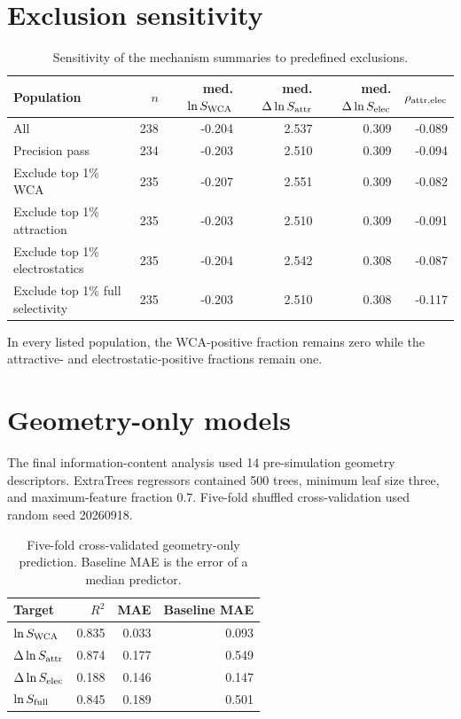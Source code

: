 \documentclass[11pt,a4paper]{article}
\begin{document}
\section{Exclusion sensitivity}

\begin{table}[H]
\centering
\caption{Sensitivity of the mechanism summaries to predefined exclusions.}
\begin{tabular}{lrrrrr}
\toprule
Population & $n$ & med. $\ln S_{\rm WCA}$ & med. $\Delta\ln S_{\rm attr}$ & med. $\Delta\ln S_{\rm elec}$ & $\rho_{\rm attr,elec}$\\
\midrule
All & 238 & -0.204 & 2.537 & 0.309 & -0.089\\
Precision pass & 234 & -0.203 & 2.510 & 0.309 & -0.094\\
Exclude top 1\% WCA & 235 & -0.207 & 2.551 & 0.309 & -0.082\\
Exclude top 1\% attraction & 235 & -0.203 & 2.510 & 0.309 & -0.091\\
Exclude top 1\% electrostatics & 235 & -0.204 & 2.542 & 0.308 & -0.087\\
Exclude top 1\% full selectivity & 235 & -0.203 & 2.510 & 0.308 & -0.117\\
\bottomrule
\end{tabular}
\end{table}

In every listed population, the WCA-positive fraction remains zero while the attractive- and electrostatic-positive fractions remain one.

\section{Geometry-only models}

The final information-content analysis used 14 pre-simulation geometry descriptors. ExtraTrees regressors contained 500 trees, minimum leaf size three, and maximum-feature fraction 0.7. Five-fold shuffled cross-validation used random seed 20260918.

\begin{table}[H]
\centering
\caption{Five-fold cross-validated geometry-only prediction. Baseline MAE is the error of a median predictor.}
\begin{tabular}{lrrr}
\toprule
Target & $R^2$ & MAE & Baseline MAE\\
\midrule
$\ln S_{\rm WCA}$ & 0.835 & 0.033 & 0.093\\
$\Delta\ln S_{\rm attr}$ & 0.874 & 0.177 & 0.549\\
$\Delta\ln S_{\rm elec}$ & 0.188 & 0.146 & 0.147\\
$\ln S_{\rm full}$ & 0.845 & 0.189 & 0.501\\
\bottomrule
\end{tabular}
\end{table}
\end{document}
